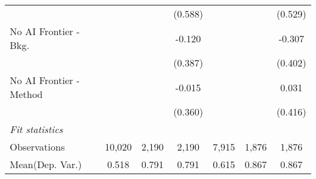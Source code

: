 \begin{tabular}{lcccccc}
                           &              &         & (0.588)      &              &         & (0.529)\\   
   No AI Frontier - Bkg.   &              &         & -0.120       &              &         & -0.307\\   
                           &              &         & (0.387)      &              &         & (0.402)\\   
   No AI Frontier - Method &              &         & -0.015       &              &         & 0.031\\   
                           &              &         & (0.360)      &              &         & (0.416)\\   
   \midrule
   \emph{Fit statistics}\\
   Observations            & 10,020       & 2,190   & 2,190        & 7,915        & 1,876   & 1,876\\  
Mean(Dep. Var.) & 0.518 & 0.791 & 0.791 & 0.615 & 0.867 & 0.867 \\
   

\end{tabular}

